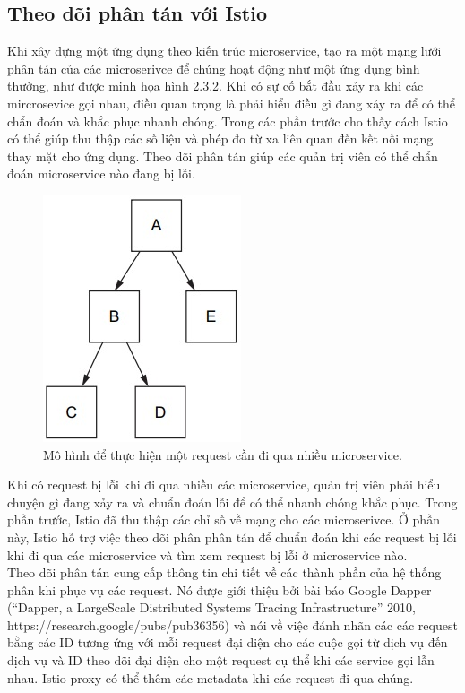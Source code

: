 \documentclass[14pt,a4paper]{book}
\begin{document}
{{\begin{figure}[h]
\end{figure}
	\subsection{Theo dõi phân tán với Istio}
		{\hspace{0.6cm}Khi xây dựng một ứng dụng theo kiến trúc microservice, tạo ra một mạng lưới phân tán của các microserivce để chúng hoạt động như một ứng dụng bình thường, như được minh họa hình 2.3.2. Khi có sự cố bắt đầu xảy ra khi các mircrosevice gọi nhau, điều quan trọng là phải hiểu điều gì đang xảy ra để có thể chẩn đoán và khắc phục nhanh chóng. Trong các phần trước cho thấy cách Istio có thể giúp thu thập các số liệu và phép đo từ xa liên quan đến kết nối mạng thay mặt cho ứng dụng. Theo dõi phân tán giúp các quản trị viên có thể chẩn đoán microservice nào đang bị lỗi.}\\
			
		\begin{figure}[h]
			\centering
			\includegraphics[width=0.3\linewidth]{Pics/Untitled}
			\caption{Mô hình để thực hiện một request cần đi qua nhiều microservice.}
			\label{fig:untitled}
		\end{figure}
	
		Khi có request bị lỗi khi đi qua nhiều các microservice, quản trị viên phải hiểu chuyện gì đang xảy ra và chuẩn đoán lỗi để có thể nhanh chóng khắc phục. Trong phần trước, Istio đã thu thập các chỉ số về mạng cho các microserivce. Ở phần này, Istio hỗ trợ việc theo dõi phân phân tán để chuẩn đoán khi các request bị lỗi khi đi qua các microservice và tìm xem request bị lỗi ở microservice nào.\\
		
		Theo dõi phân tán cung cấp thông tin chi tiết về các thành phần của hệ thống phân khi phục vụ các request. Nó được giới thiệu bởi bài báo Google Dapper (“Dapper, a LargeScale Distributed Systems Tracing Infrastructure” 2010, https://research.google/pubs/pub36356) 
		và nói về việc đánh nhãn các các request bằng các ID tương ứng với mỗi request đại diện cho các cuộc gọi từ dịch vụ đến dịch vụ và ID theo dõi đại diện cho một request cụ thể khi các service gọi lẫn nhau. Istio proxy có thể thêm các metadata khi các request đi qua chúng.\\
		
}}
\end{document}
